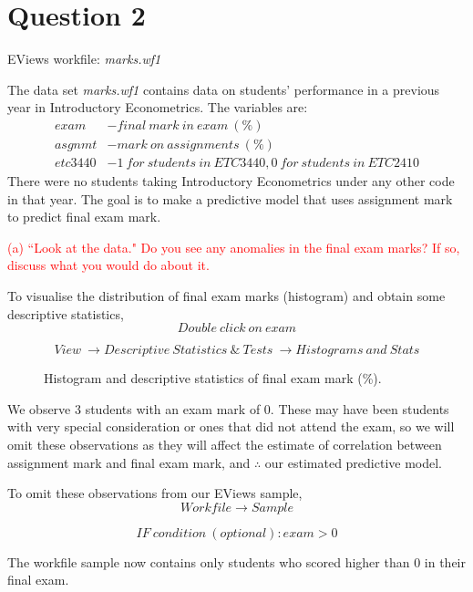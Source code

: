 \documentclass[12pt]{report}
\begin{document}
\newpage
\section*{Question 2}
\noindent EViews workfile: \textit{marks.wf1}

\noindent The data set \textit{marks.wf1} contains data on students’ performance in a previous year in Introductory Econometrics. The variables are:
\begin{align*}
	exam &- final\ mark\ in\ exam\ (\%) \\
	asgnmt &- mark\ on\ assignments\ (\%) \\
	etc3440 &- 1\ for\ students\ in\ ETC3440, 0\ for\ students\ in\ ETC2410
\end{align*}
\noindent There were no students taking Introductory Econometrics under any other code in that year. The goal is to make a predictive model that uses assignment mark to predict final exam mark.

\noindent \textcolor{red}{(a) ``Look at the data." Do you see any anomalies in the final exam marks? If so, discuss what you would do about it.}

\noindent To visualise the distribution of final exam marks (histogram) and obtain some descriptive statistics,
$$Double\ click\ on\ exam$$
\begin{figure}[H]
	\centering
\end{figure}
\vspace{-\baselineskip}
$$View\ \to Descriptive\ Statistics\ \&\ Tests\ \to Histograms\ and\ Stats$$
\begin{figure}[H]
	\caption{Histogram and descriptive statistics of final exam mark (\%).}
\end{figure}
\vspace{-\baselineskip}

\noindent We observe 3 students with an exam mark of 0. These may have been students with very special consideration or ones that did not attend the exam, so we will omit these observations as they will affect the estimate of correlation between assignment mark and final exam mark, and $\therefore$ our estimated predictive model.

\noindent To omit these observations from our EViews sample,
$$Workfile \to Sample$$
\begin{figure}[H]
	\centering
\end{figure}
\vspace{-\baselineskip}
$$IF\ condition\ (optional): exam>0$$
\begin{figure}[H]
	\centering
\end{figure}
\vspace{-\baselineskip}
\noindent The workfile sample now contains only students who scored higher than 0 in their final exam.
\begin{figure}[H]
	\centering
\end{figure}
\vspace{-\baselineskip}
\end{document}
